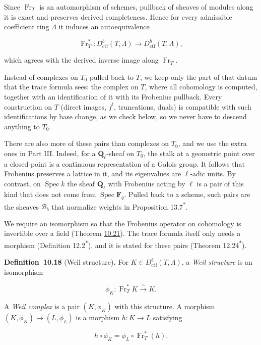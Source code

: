 \documentclass[11pt]{article}
\newenvironment{bpstatement}[2]{\par\addvspace{0.6\baselineskip}\noindent\textbf{#1}#2\textbf{.}\enspace\ignorespaces}
  {\par\addvspace{0.4\baselineskip}}
\newcommand{\bpout}[1]{#1\textsuperscript{\hyperlink{bp-outside}{\ensuremath{\ast}}}}
\begin{document}
Since \(\operatorname{Fr}_T\) is an automorphism of schemes, pullback of sheaves of modules along it is exact and preserves derived completeness. Hence for every admissible coefficient ring \(\Lambda\) it induces an autoequivalence

\[
\operatorname{Fr}_T^*:
D^b_{\mathrm{ctf}}(T,\Lambda)\longrightarrow
D^b_{\mathrm{ctf}}(T,\Lambda),
\]

which agrees with the derived inverse image along \(\operatorname{Fr}_T\).

Instead of complexes on \(T_0\) pulled back to \(T\), we keep only the part of that datum that the trace formula sees: the complex on \(T\), where all cohomology is computed, together with an identification of it with its Frobenius pullback. Every construction on \(T\) (direct images, \(f^!\), truncations, duals) is compatible with such identifications by base change, as we check below, so we never have to descend anything to \(T_0\).

There are also more of these pairs than complexes on \(T_0\), and we use the extra ones in Part III. Indeed, for a \(\mathbf Q_\ell\)-sheaf on \(T_0\), the stalk at a geometric point over a closed point is a continuous representation of a Galois group. It follows that Frobenius preserves a lattice in it, and its eigenvalues are \(\ell\)-adic units. By contrast, on \(\operatorname{Spec}k\) the sheaf \(\mathbf Q_\ell\) with Frobenius acting by \(\ell\) is a pair of this kind that does not come from \(\operatorname{Spec}\mathbf F_q\). Pulled back to a scheme, such pairs are the sheaves \(\mathcal B_b\) that normalize weights in Proposition \bpout{13.7}.

We require an isomorphism so that the Frobenius operator on cohomology is invertible over a field (Theorem \hyperref[bp65]{10.21}). The trace formula itself only needs a morphism (Definition \bpout{12.2}), and it is stated for these pairs (Theorem \bpout{12.24}).

\label{bp56}%
\begin{bpstatement}{Definition~10.18}{ (Weil structure)}
For \(K\in D^b_{\mathrm{ctf}}(T,\Lambda)\), a \emph{Weil structure} is an isomorphism

\[
\phi_K:\operatorname{Fr}_T^*K\xrightarrow{\sim}K.
\]

A \emph{Weil complex} is a pair \((K,\phi_K)\) with this structure. A morphism \((K,\phi_K)\to(L,\phi_L)\) is a morphism \(h:K\to L\) satisfying

\[
h\circ\phi_K=\phi_L\circ\operatorname{Fr}_T^*(h).
\]
\end{bpstatement}
\end{document}
